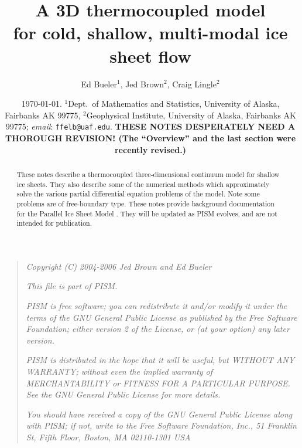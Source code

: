 \documentclass[12pt,final]{amsart}%
\newcommand{\normalspacing}{\renewcommand{\baselinestretch}{1.1}\tiny\normalsize}
\newcommand{\tablespacing}{\renewcommand{\baselinestretch}{1.0}\tiny\normalsize}
\theoremstyle{plain}
\theoremstyle{definition}
\theoremstyle{remark}
\newcommand{\mtt}{\texttt}
\begin{document}
\title[A 3D thermocoupled model for ice sheets]{A 3D thermocoupled model \\ for cold, shallow, multi-modal ice sheet flow}

\author[Bueler, Brown, and Lingle]{Ed Bueler$^1$, Jed Brown$^2$, Craig Lingle$^2$}

\date{\scriptsize \today.   $^1$Dept.~of Mathematics and Statistics, University of Alaska, Fairbanks AK 99775, $^2$Geophysical Institute, University of Alaska, Fairbanks AK 99775;  \emph{email}: \mtt{ffelb@uaf.edu}.  \textbf{THESE NOTES DESPERATELY NEED A THOROUGH REVISION!  (The ``Overview'' and the last section were recently revised.)}\normalsize}

\begin{abstract}  These notes describe a thermocoupled three-dimensional continuum model for shallow ice sheets.  They also describe some of the numerical methods which approximately solve the various partial differential equation problems of the model.  Note some problems are of free-boundary type.  These notes provide background documentation for the Parallel Ice Sheet Model  \citep{pism-web-page}.  They will be updated as PISM evolves, and are not intended for publication.\end{abstract}

\maketitle
\tablespacing
\setcounter{tocdepth}{1}
\tableofcontents


\newpage
\phantom{bob}
\vspace{2in}
\begin{quote}
\textsl{Copyright (C) 2004-2006 Jed Brown and Ed Bueler}
\medskip

\noindent \textsl{This file is part of PISM.}
\medskip

\noindent \textsl{PISM is free software; you can redistribute it and/or modify it under the terms of the GNU General Public License as published by the Free Software Foundation; either version 2 of the License, or (at your option) any later version.}
\medskip

\noindent \textsl{PISM is distributed in the hope that it will be useful, but WITHOUT ANY WARRANTY; without even the implied warranty of MERCHANTABILITY or FITNESS FOR A PARTICULAR PURPOSE.  See the GNU General Public License for more details.}
\medskip

\noindent \textsl{You should have received a copy of the GNU General Public License along with PISM; if not, write to the Free Software Foundation, Inc., 51 Franklin St, Fifth Floor, Boston, MA  02110-1301 USA}
\end{quote}
\vspace{1in}
\normalspacing
\end{document}
